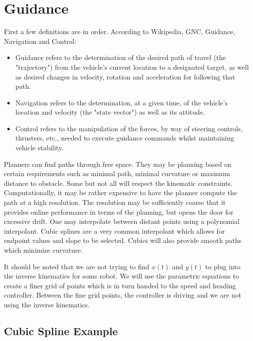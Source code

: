 \hypertarget{guidance}{%
\section{Guidance}\label{guidance}}

First a few definitions are in order. According to Wikipedia, GNC,
Guidance, Navigation and Control:

\begin{itemize}
\tightlist
\item
  Guidance refers to the determination of the desired path of travel
  (the "trajectory") from the vehicle's current location to a designated
  target, as well as desired changes in velocity, rotation and
  acceleration for following that path.
\item
  Navigation refers to the determination, at a given time, of the
  vehicle's location and velocity (the "state vector") as well as its
  attitude.
\item
  Control refers to the manipulation of the forces, by way of steering
  controls, thrusters, etc., needed to execute guidance commands whilst
  maintaining vehicle stability.
\end{itemize}

Planners can find paths through free space. They may be planning based
on certain requirements such as minimal path, minimal curvature or
maximum distance to obstacle. Some but not all will respect the
kinematic constraints. Computationally, it may be rather expensive to
have the planner compute the path at a high resolution. The resolution
may be sufficiently coarse that it provides online performance in terms
of the planning, but opens the door for excessive drift. One may
interpolate between distant points using a polynomial interpolant. Cubic
splines are a very common interpolant which allows for endpoint values
and slope to be selected. Cubics will also provide smooth paths which
minimize curvature.

It should be noted that we are not trying to find \(x(t)\) and \(y(t)\)
to plug into the inverse kinematics for some robot. We will use the
parametric equations to create a finer grid of points which is in turn
handed to the speed and heading controller. Between the fine grid
points, the controller is driving and we are not using the inverse
kinematics.

\hypertarget{cubic-spline-example}{%
\subsection{Cubic Spline Example}\label{cubic-spline-example}}

